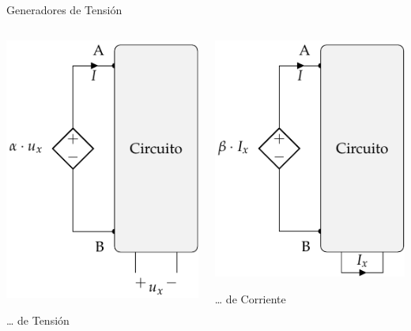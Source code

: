 \documentclass[aspectratio=169, usenames,svgnames,dvipsnames]{beamer}
\begin{document}
\begin{frame}[label={sec:org0953216}]{Generadores de Tensión}
\begin{columns}
\begin{column}{0.5\columnwidth}
  \begin{center}
\includegraphics[height=0.7\textheight]{../figs/FuenteTensionDependienteTension.pdf}
\end{center}
\ldots{} de Tensión
\end{column}
\begin{column}{0.5\columnwidth}
  \begin{center}
\includegraphics[height=0.7\textheight]{../figs/FuenteTensionDependienteCorriente.pdf}
\end{center}
\ldots{} de Corriente
\end{column}
\end{columns}
\end{frame}
\end{document}
